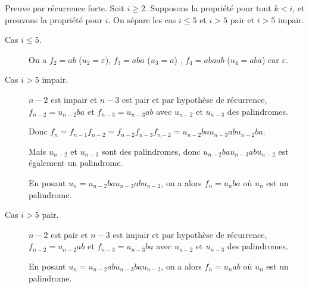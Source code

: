 \begin{corrections}

  \begin{questions}
  \item Preuve par récurrence forte. Soit $i \ge 2$. Supposons la propriété pour tout $k<i$,
    et prouvons la propriété pour $i$. On sépare les cas $i\le 5$ et $i > 5$ pair et $i > 5$ impair.
    \begin{description}
    \item [Cas $i \le 5$.]  On a $f_2 = ab$ ($u_2=\varepsilon$), $f_3 = aba$ ($u_3=a$) , $f_4 = abaab$ ($u_4=aba$) car $\varepsilon$.
    \item [Cas $i > 5$ impair.] $n-2$ est impair et $n-3$ est pair et
      par hypothèse de récurrence, $f_{n-2} = u_{n-2} b a$ et $f_{n-3}= u_{n-3} a b$
      avec $u_{n-2}$ et $u_{n-3}$ des palindromes.

      Donc $f_{n} = f_{n-1} f_{n-2} = f_{n-2} f_{n-3} f_{n-2} = u_{n-2} b a u_{n-3} a b u_{n-2} b a$.

      Mais $u_{n-2}$ et $u_{n-3}$ sont des palindromes, donc $u_{n-2} b a u_{n-3} a b u_{n-2}$ est également un palindrome.

      En posant $u_{n} = u_{n-2} b a u_{n-3} a b u_{n-2}$, on a alors $f_{n}  = u_n ba$ où $u_n$ est un palindrome.

    \item [Cas $i > 5$ pair.]
      $n-2$ est pair et $n-3$ est impair et
      par hypothèse de récurrence, $f_{n-2} = u_{n-2} a b$ et $f_{n-3}= u_{n-3} b a$
      avec $u_{n-2}$ et $u_{n-3}$ des palindromes.
      
      En posant $u_{n} = u_{n-2} a b  u_{n-3} b a  u_{n-2}$, on a alors $f_{n}  = u_n ab$ où $u_n$ est un palindrome.
    \end{description}
  \end{questions}

\end{corrections}

\endgroup
\endinput
